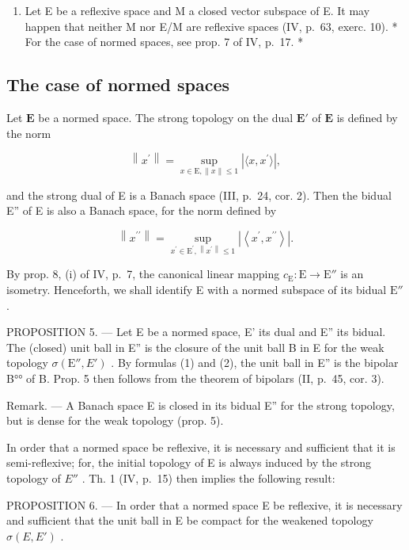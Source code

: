 \begin{enumerate}
\def\labelenumi{\arabic{enumi})}
\setcounter{enumi}{1}
\tightlist
\item
  Let E be a reflexive space and M a closed vector subspace of E. It may happen that neither M nor E/M are reflexive spaces (IV, p.~63, exerc. 10). * For the case of normed spaces, see prop. 7 of IV, p.~17. *
\end{enumerate}

\subsection{The case of normed spaces}

Let \(\mathbf{E}\) be a normed space. The strong topology on the dual \(\mathbf{E}'\) of \(\mathbf{E}\) is defined by the norm

\[
\left\| x ^ {\prime} \right\| = \sup _ {x \in \mathrm{E}, \| x \| \leqslant 1} \left| \langle x, x ^ {\prime} \rangle \right|,\tag{1}
\]

and the strong dual of E is a Banach space (III, p.~24, cor. 2). Then the bidual E'' of E is also a Banach space, for the norm defined by

\[
\left\| x ^ {\prime \prime} \right\| = \sup _ {x ^ {\prime} \in \mathrm{E} ^ {\prime}, \left\| x ^ {\prime} \right\| \leqslant 1} \left| \left\langle x ^ {\prime}, x ^ {\prime \prime} \right\rangle \right|.\tag{2}
\]

By prop. 8, (i) of IV, p.~7, the canonical linear mapping \(c_{\mathrm{E}}: \mathrm{E} \to \mathrm{E}''\) is an isometry. Henceforth, we shall identify E with a normed subspace of its bidual \(\mathrm{E}''\) .

PROPOSITION 5. --- Let E be a normed space, E' its dual and E'' its bidual. The (closed) unit ball in E'' is the closure of the unit ball B in E for the weak topology \(\sigma(\mathrm{E}'', E')\) . By formulas (1) and (2), the unit ball in E'' is the bipolar B°° of B. Prop. 5 then follows from the theorem of bipolars (II, p.~45, cor. 3).

Remark. --- A Banach space E is closed in its bidual E'' for the strong topology, but is dense for the weak topology (prop. 5).

In order that a normed space be reflexive, it is necessary and sufficient that it is semi-reflexive; for, the initial topology of E is always induced by the strong topology of \(E''\) . Th. 1 (IV, p.~15) then implies the following result:

PROPOSITION 6. --- In order that a normed space E be reflexive, it is necessary and sufficient that the unit ball in E be compact for the weakened topology \(\sigma(E, E')\) .


